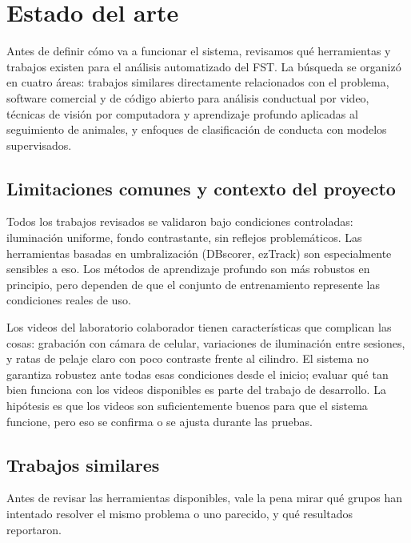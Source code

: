 \chapter{Estado del arte}

Antes de definir cómo va a funcionar el sistema, revisamos qué herramientas y trabajos
existen para el análisis automatizado del FST. La búsqueda se organizó en cuatro áreas:
trabajos similares directamente relacionados con el problema, software comercial y de
código abierto para análisis conductual por video, técnicas de visión por computadora y
aprendizaje profundo aplicadas al seguimiento de animales, y enfoques de clasificación
de conducta con modelos supervisados.

\section{Limitaciones comunes y contexto del proyecto}

Todos los trabajos revisados se validaron bajo condiciones controladas: iluminación
uniforme, fondo contrastante, sin reflejos problemáticos. Las herramientas basadas en
umbralización (DBscorer, ezTrack) son especialmente sensibles a eso. Los métodos de
aprendizaje profundo son más robustos en principio, pero dependen de que el conjunto
de entrenamiento represente las condiciones reales de uso.

Los videos del laboratorio colaborador tienen características que complican las cosas:
grabación con cámara de celular, variaciones de iluminación entre sesiones, y ratas de
pelaje claro con poco contraste frente al cilindro. El sistema no garantiza robustez
ante todas esas condiciones desde el inicio; evaluar qué tan bien funciona con los videos
disponibles es parte del trabajo de desarrollo. La hipótesis es que los videos son
suficientemente buenos para que el sistema funcione, pero eso se confirma o se ajusta
durante las pruebas.

\section{Trabajos similares}

Antes de revisar las herramientas disponibles, vale la pena mirar qué grupos han
intentado resolver el mismo problema o uno parecido, y qué resultados reportaron.

